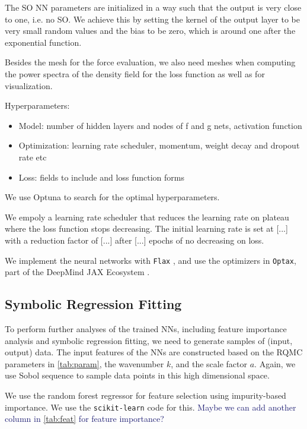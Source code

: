 \documentclass[modern, trackchanges, dvipsnames]{aastex631}
\newcommand{\YZ}[1]{\textcolor{MidnightBlue}{#1}}
\begin{document}
The SO NN parameters are initialized in a way such that the output
is very close to one, i.e. no SO.
We achieve this by setting the kernel of the output layer to be very
small random values and the bias to be zero, which is around one after
the exponential function.

Besides the mesh for the force evaluation, we also need meshes when
computing the power spectra of the density field for the loss function
as well as for visualization.

Hyperparameters:
\begin{itemize}
  \item Model: number of hidden layers and nodes of f and g nets,
  activation function
  \item Optimization: learning rate scheduler, momentum, weight decay
  and dropout rate etc
  \item Loss: fields to include and loss function forms
\end{itemize}

We use Optuna \citep{optuna_2019} to search for the optimal
hyperparameters.

We empoly a learning rate scheduler that reduces the learning rate on
plateau where the loss function stops decreasing.
The initial learning rate is set at [...] with a reduction factor of
[...] after [...] epochs of no decreasing on loss.


We implement the neural networks with \texttt{Flax}
\citep{flax2020github}, and use the optimizers in \texttt{Optax}, part
of the DeepMind JAX Ecosystem
\citep{deepmind2020jax}.



\vspace{1em}
\subsection{Symbolic Regression Fitting}

To perform further analyses of the trained NNs, including feature
importance analysis and symbolic regression fitting, we need to generate
samples of (input, output) data.
The input features of the NNs are constructed based on the RQMC
parameters in \autoref{tab:param}, the wavenumber $k$, and the scale
factor $a$.
Again, we use Sobol sequence to sample data points in this high
dimensional space.

We use the random forest regressor for feature selection using
impurity-based importance.
We use the \texttt{scikit-learn} \citep{scikit-learn} code for this.
\YZ{Maybe we can add another column in \autoref{tab:feat} for feature
importance?}
\end{document}
